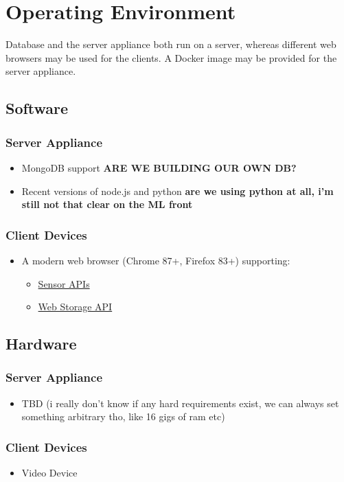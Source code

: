 \section{Operating Environment}
Database and the server appliance both run on a server, whereas different web browsers may be used for the clients. A Docker image may be provided for the server appliance.

\subsection{Software}
\subsubsection{Server Appliance}
\begin{itemize}
    \item MongoDB support \textbf{ARE WE BUILDING OUR OWN DB?}
    \item Recent versions of node.js and python \textbf{are we using python at all, i'm still not that clear on the ML front}
\end{itemize}
\subsubsection{Client Devices}
\begin{itemize}
    \item A modern web browser (Chrome 87+, Firefox 83+) supporting:
    \begin{itemize}
        \item \href{https://developer.mozilla.org/en-US/docs/Web/API/Sensor_APIs}{Sensor APIs}
        \item \href{https://developer.mozilla.org/en-US/docs/Web/API/Web_Storage_API}{Web Storage API}
    \end{itemize}
\end{itemize}

\subsection{Hardware}
\subsubsection{Server Appliance}
\begin{itemize}
    \item TBD (i really don't know if any hard requirements exist, we can always set something arbitrary tho, like 16 gigs of ram etc)
\end{itemize}
\subsubsection{Client Devices}
\begin{itemize}
    \item Video Device
\end{itemize}
